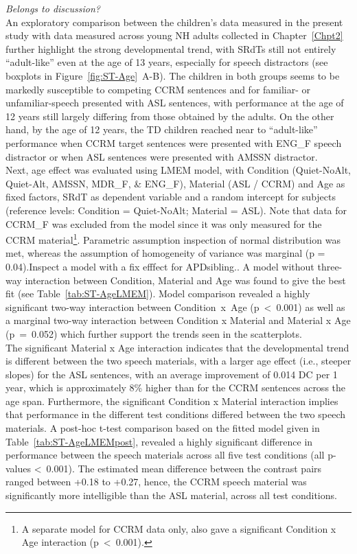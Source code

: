 \documentclass[a4paper, twoside]{templates/ociamthesis}
\begin{document}
\colorbox[HTML]{CCCCFF}{\emph{Belongs to discussion?}}\\
An exploratory comparison between the children's data measured in the present study with data measured across young NH adults collected in Chapter~\ref{Chpt2} further highlight the strong developmental trend, with SRdTs still not entirely ``adult-like'' even at the age of 13 years, especially for speech distractors (see boxplots in Figure~\ref{fig:ST-Age}~A-B). The children in both groups seems to be markedly susceptible to competing CCRM sentences and for familiar- or unfamiliar-speech presented with ASL sentences, with performance at the age of 12 years still largely differing from those obtained by the adults. On the other hand, by the age of 12 years, the TD children reached near to ``adult-like'' performance when CCRM target sentences were presented with ENG\_F speech distractor or when ASL sentences were presented with AMSSN distractor.\\

Next, age effect was evaluated using LMEM model, with Condition (Quiet-NoAlt, Quiet-Alt, AMSSN, MDR\_F, \& ENG\_F), Material (ASL / CCRM) and Age as fixed factors, SRdT as dependent variable and a random intercept for subjects (reference levels: Condition = Quiet-NoAlt; Material = ASL). Note that data for CCRM\_F was excluded from the model since it was only measured for the CCRM material\footnote{A separate model for CCRM data only, also gave a significant Condition x Age interaction (p~\textless~0.001).}. Parametric assumption inspection of normal distribution was met, whereas the assumption of homogeneity of variance was marginal (p = 0.04).\colorbox[HTML]{CCCCFF}{Inspect a model with a fix efffect for APDsibling..} A model without three-way interaction between Condition, Material and Age was found to give the best fit (see Table~\ref{tab:ST-AgeLMEM}). Model comparison revealed a highly significant two-way interaction between Condition~x~Age (p~\textless~0.001) as well as a marginal two-way interaction between Condition x Material and Material x Age (p~=~0.052) which further support the trends seen in the scatterplots.\\

The significant Material x Age interaction indicates that the developmental trend is different between the two speech materials, with a larger age effect (i.e., steeper slopes) for the ASL sentences, with an average improvement of 0.014 DC per 1 year, which is approximately 8\% higher than for the CCRM sentences across the age span. Furthermore, the significant Condition x Material interaction implies that performance in the different test conditions differed between the two speech materials. A post-hoc t-test comparison based on the fitted model given in Table~\ref{tab:ST-AgeLMEMpost}, revealed a highly significant difference in performance between the speech materials across all five test conditions (all p-values \textless~0.001). The estimated mean difference between the contrast pairs ranged between +0.18 to +0.27, hence, the CCRM speech material was significantly more intelligible than the ASL material, across all test conditions.\\
\end{document}
